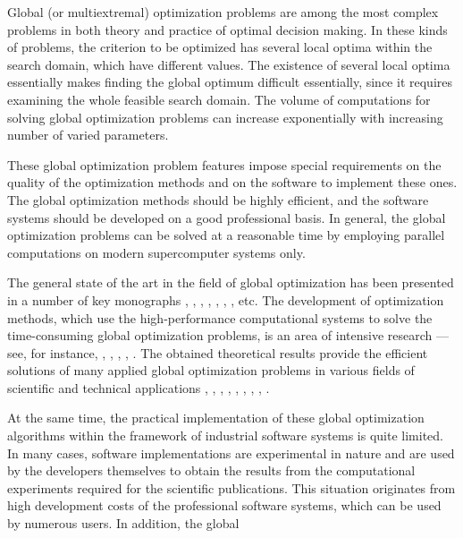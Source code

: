 \documentclass{aims}
\theoremstyle{definition}
\begin{document}
Global (or multiextremal) optimization problems are among the most complex problems
in both theory and practice of optimal decision making. In these kinds of problems,
the criterion to be optimized has several local optima within the search domain,
which have different values. The existence of several local optima essentially makes
finding the global optimum difficult essentially, since it requires examining the whole feasible
search domain. The volume of computations for solving global optimization problems
can increase exponentially with increasing number of varied parameters.
\par
These global optimization problem features impose special requirements on the quality
of the optimization methods and on the software to implement these ones. The global
optimization methods should be highly efficient, and the software systems should be developed on
a good professional basis. In general, the global optimization problems can be solved at
a reasonable time by employing parallel computations on modern supercomputer systems only.
\par
The general state of the art in the field of global optimization has been presented in a
number of key monographs  \cite{floudasPardGO}, \cite{horstTuyGO}, \cite{locatelliSchoenGO}, \cite{pinterGO}, \cite{strSergGO}, \cite{zilinskTornGO}, \cite{zhigljavskyRandGO}, etc.
The development of optimization methods, which use the high-performance computational
systems to solve the time-consuming global optimization problems, is an area of
intensive research --- see, for instance, \cite{censorZeniosParGO}, \cite{ciegisHentyParGO},
\cite{luqueAlbaGA}, \cite{stronginGergelBarkalovParGO}, \cite{strSergGO}. The obtained
theoretical results provide the efficient solutions of many applied global
optimization problems in various fields of scientific and technical applications \cite{Famularo1999}, \cite{fasanoPinter2013},
\cite{floudasPardalosGOState}, \cite{Kvasov2015}, \cite{Menniti}, \cite{locatelliSchoenGO},
\cite{luqueAlbaGA}, \cite{pardalosZhigljavskyZilinskas2016}, \cite{pinterGO}.
\par
At the same time, the practical implementation of these global optimization algorithms
within the framework of industrial software systems is quite limited. In many cases,
software implementations are experimental in nature and are used by the developers
themselves to obtain the results from the computational experiments required for the
scientific publications. This situation originates from high development costs of the
professional software systems, which can be used by numerous users. In addition, the global
\end{document}
